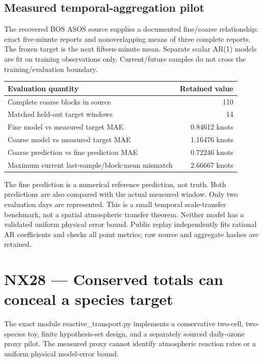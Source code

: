 \documentclass[
  11pt,
  a4paper,
]{report}
\begin{document}
\hypertarget{measured-temporal-aggregation-pilot}{%
\section{Measured temporal-aggregation
pilot}\label{measured-temporal-aggregation-pilot}}

The recovered BOS ASOS source supplies a documented fine/coarse
relationship: exact five-minute reports and nonoverlapping means of
three complete reports. The frozen target is the next fifteen-minute
mean. Separate scalar AR(1) models are fit on training observations
only. Current/future samples do not cross the training/evaluation
boundary.

\begin{longtable}[]{@{}lr@{}}
\toprule\noalign{}
Evaluation quantity & Retained value \\
\midrule\noalign{}
\endhead
\bottomrule\noalign{}
\endlastfoot
Complete coarse blocks in source & 110 \\
Matched held-out target windows & 14 \\
Fine model vs measured target MAE & 0.84612 knots \\
Coarse model vs measured target MAE & 1.16476 knots \\
Coarse prediction vs fine prediction MAE & 0.72246 knots \\
Maximum current last-sample/block-mean mismatch & 2.66667 knots \\
\end{longtable}

The fine prediction is a numerical reference prediction, not truth. Both
predictions are also compared with the actual measured window. Only two
evaluation days are represented. This is a small temporal scale-transfer
benchmark, not a spatial atmospheric transfer theorem. Neither model has
a validated uniform physical error bound. Public replay independently
fits rational AR coefficients and checks all point metrics; raw source
and aggregate hashes are retained.

\hypertarget{nx28-conserved-totals-can-conceal-a-species-target}{%
\chapter{NX28 --- Conserved totals can conceal a species
target}\label{nx28-conserved-totals-can-conceal-a-species-target}}

The exact module reactive\_transport.py implements a conservative
two-cell, two-species toy, finite hypothesis-set design, and a
separately sourced daily-ozone proxy pilot. The measured proxy cannot
identify atmospheric reaction rates or a uniform physical model-error
bound.
\end{document}
